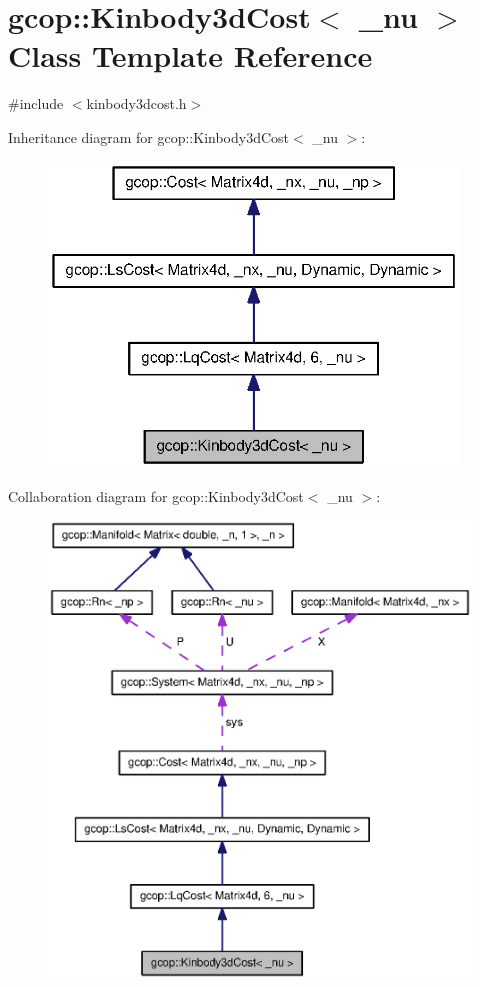 \section{gcop\-:\-:\-Kinbody3d\-Cost$<$ \-\_\-nu $>$ \-Class \-Template \-Reference}
\label{classgcop_1_1Kinbody3dCost}


{\ttfamily \#include $<$kinbody3dcost.\-h$>$}



\-Inheritance diagram for gcop\-:\-:\-Kinbody3d\-Cost$<$ \-\_\-nu $>$\-:\nopagebreak
\begin{figure}[H]
\begin{center}
\leavevmode
\includegraphics[width=308pt]{classgcop_1_1Kinbody3dCost__inherit__graph}
\end{center}
\end{figure}


\-Collaboration diagram for gcop\-:\-:\-Kinbody3d\-Cost$<$ \-\_\-nu $>$\-:\nopagebreak
\begin{figure}[H]
\begin{center}
\leavevmode
\includegraphics[width=350pt]{classgcop_1_1Kinbody3dCost__coll__graph}
\end{center}
\end{figure}
